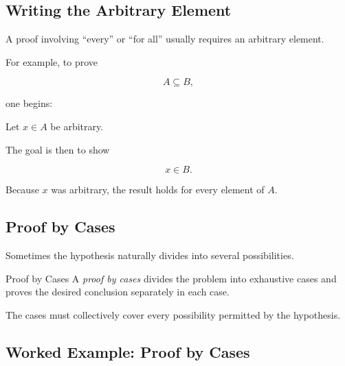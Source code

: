\subsection{Writing the Arbitrary Element}
\label{subsec:arbitrary-element}

A proof involving ``every'' or ``for all'' usually requires an arbitrary
element.

For example, to prove

\[ A\subseteq B, \]

one begins:

\begin{center}
Let \(x\in A\) be arbitrary.
\end{center}

The goal is then to show

\[ x\in B. \]

Because \(x\) was arbitrary, the result holds for every element of \(A\).

\subsection{Proof by Cases}
\label{subsec:proof-by-cases}

Sometimes the hypothesis naturally divides into several possibilities.

\begin{definitionbox}{Proof by Cases}
A \emph{proof by cases} divides the problem into exhaustive cases and proves
the desired conclusion separately in each case.
\end{definitionbox}

The cases must collectively cover every possibility permitted by the
hypothesis.

\subsection{Worked Example: Proof by Cases}
\label{subsec:worked-proof-cases}

